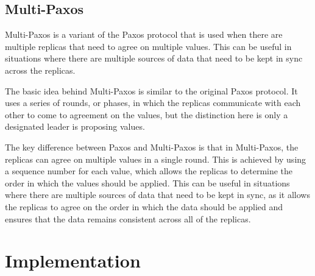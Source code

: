\documentclass[sigconf]{acmart}
\begin{document}
\subsection{Multi-Paxos}

Multi-Paxos is a variant of the Paxos protocol that is used when there are multiple replicas that need to agree on multiple values. This can be useful in situations where there are multiple sources of data that need to be kept in sync across the replicas.

The basic idea behind Multi-Paxos is similar to the original Paxos protocol. It uses a series of rounds, or phases, in which the replicas communicate with each other to come to agreement on the values, but the distinction here is only a designated leader is proposing values.

The key difference between Paxos and Multi-Paxos is that in Multi-Paxos, the replicas can agree on multiple values in a single round. This is achieved by using a sequence number for each value, which allows the replicas to determine the order in which the values should be applied. This can be useful in situations where there are multiple sources of data that need to be kept in sync, as it allows the replicas to agree on the order in which the data should be applied and ensures that the data remains consistent across all of the replicas.

\section{Implementation}
\end{document}
